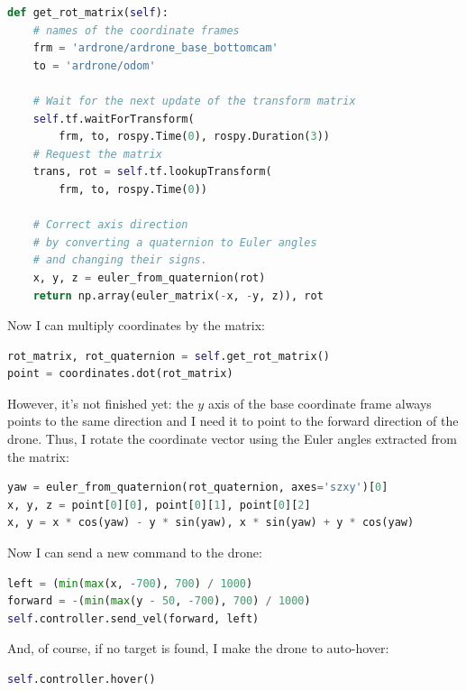 \documentclass[12pt]{article}
\begin{document}
    \begin{lstlisting}[frame=single,language=Python]
def get_rot_matrix(self):
    # names of the coordinate frames
    frm = 'ardrone/ardrone_base_bottomcam'
    to = 'ardrone/odom'

    # Wait for the next update of the transform matrix
    self.tf.waitForTransform(
        frm, to, rospy.Time(0), rospy.Duration(3))
    # Request the matrix
    trans, rot = self.tf.lookupTransform(
        frm, to, rospy.Time(0))

    # Correct axis direction
    # by converting a quaternion to Euler angles
    # and changing their signs.
    x, y, z = euler_from_quaternion(rot)
    return np.array(euler_matrix(-x, -y, z)), rot
    \end{lstlisting}

    Now I can multiply coordinates by the matrix:

    \begin{lstlisting}[frame=single,language=Python]
rot_matrix, rot_quaternion = self.get_rot_matrix()
point = coordinates.dot(rot_matrix)
    \end{lstlisting}

    However, it's not finished yet: the $y$ axis of the base coordinate frame
    always points to the same direction and I need it to point to the
    forward direction of the drone. Thus, I rotate the coordinate vector
    using the Euler angles extracted from the matrix:

    \begin{lstlisting}[frame=single,language=Python]
yaw = euler_from_quaternion(rot_quaternion, axes='szxy')[0]
x, y, z = point[0][0], point[0][1], point[0][2]
x, y = x * cos(yaw) - y * sin(yaw), x * sin(yaw) + y * cos(yaw)
    \end{lstlisting}

    Now I can send a new command to the drone:

    \begin{lstlisting}[frame=single,language=Python]
left = (min(max(x, -700), 700) / 1000)
forward = -(min(max(y - 50, -700), 700) / 1000)
self.controller.send_vel(forward, left)
    \end{lstlisting}

    And, of course, if no target is found, I make the drone to auto-hover:

    \begin{lstlisting}[frame=single,language=Python]
self.controller.hover()
    \end{lstlisting}
\end{document}
